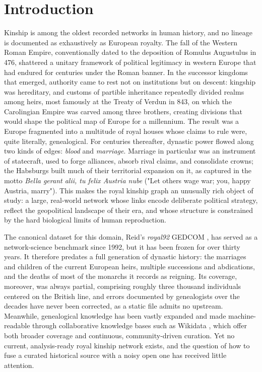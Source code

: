 \maketitle

\section{Introduction}

Kinship is among the oldest recorded networks in human history, and no lineage is documented as exhaustively as European royalty. The fall of the Western Roman Empire, conventionally dated to the deposition of Romulus Augustulus in 476, shattered a unitary framework of political legitimacy in western Europe that had endured for centuries under the Roman banner. In the successor kingdoms that emerged, authority came to rest not on institutions but on descent: kingship was hereditary, and customs of partible inheritance repeatedly divided realms among heirs, most famously at the Treaty of Verdun in 843, on which the Carolingian Empire was carved among three brothers, creating divisions that would shape the political map of Europe for a millennium. The result was a Europe fragmented into a multitude of royal houses whose claims to rule were, quite literally, genealogical. For centuries thereafter, dynastic power flowed along two kinds of edges: \emph{blood} and \emph{marriage}. Marriage in particular was an instrument of statecraft, used to forge alliances, absorb rival claims, and consolidate crowns; the Habsburgs built much of their territorial expansion on it, as captured in the motto \emph{Bella gerant alii, tu felix Austria nube} ("Let others wage war; you, happy Austria, marry"). This makes the royal kinship graph an unusually rich object of study: a large, real-world network whose links encode deliberate political strategy, reflect the geopolitical landscape of their era, and whose structure is constrained by the hard biological limits of human reproduction.

The canonical dataset for this domain, Reid's \emph{royal92} GEDCOM \cite{reid1992}, has served as a network-science benchmark since 1992, but it has been frozen for over thirty years. It therefore predates a full generation of dynastic history: the marriages and children of the current European heirs, multiple successions and abdications, and the deaths of most of the monarchs it records as reigning. Its coverage, moreover, was always partial, comprising roughly three thousand individuals centered on the British line, and errors documented by genealogists over the decades have never been corrected, as a static file admits no upstream. Meanwhile, genealogical knowledge has been vastly expanded and made machine-readable through collaborative knowledge bases such as Wikidata \cite{vrandecic2014wikidata}, which offer both broader coverage and continuous, community-driven curation. Yet no current, analysis-ready royal kinship network exists, and the question of how to fuse a curated historical source with a noisy open one has received little attention.


